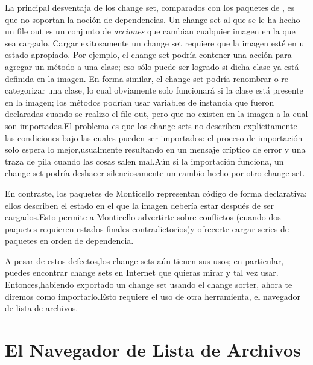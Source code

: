 \documentclass[spanish,a4paper,10pt,twoside]{book}
\begin{document}
La principal desventaja de los change set, comparados con los paquetes de
, es que no soportan la noci\'on de dependencias. Un change set
al que se le ha hecho un file out es un conjunto de \emph{acciones} que cambian
cualquier imagen en la que sea cargado. Cargar exitosamente un change set
requiere que la imagen est\'e en u estado apropiado. Por ejemplo, el change set
podr\'ia contener una acción para agregar un m\'etodo a una clase; eso s\'olo
puede ser logrado si dicha clase ya est\'a definida en la imagen. En forma
similar, el change set podr\'ia renombrar o re-categorizar una clase, lo cual
obviamente solo funcionar\'a si la clase está presente en la imagen; los
m\'etodos podr\'ian usar variables de instancia que fueron declaradas cuando se
realizo el file out, pero que no existen en la imagen a la cual son importadas.El problema
es que los change sets no describen expl\'icitamente las condiciones bajo las
cuales pueden ser importados: el proceso de importaci\'on solo espera lo
mejor,usualmente resultando en un mensaje cr\'iptico de error y una traza de
pila cuando las cosas salen mal.A\'un si la importaci\'on funciona, un change
set podr\'ia deshacer silenciosamente un cambio hecho por otro change set.

En contraste, los paquetes de Monticello representan c\'odigo de forma
declarativa: ellos describen el estado en el que la imagen deber\'ia estar
despu\'es de ser cargados.Esto permite a Monticello advertirte sobre conflictos
(cuando dos paquetes requieren estados finales contradictorios)y ofrecerte
cargar series de paquetes en orden de dependencia.

A pesar de estos defectos,los change sets a\'un tienen sus usos; en particular,
puedes encontrar change sets en Internet que quieras mirar y tal vez usar.
Entonces,habiendo exportado un change set usando el change sorter, ahora te
diremos como importarlo.Esto requiere el uso de otra herramienta, el navegador
de lista de archivos.


\section{El Navegador de Lista de Archivos}
\end{document}
